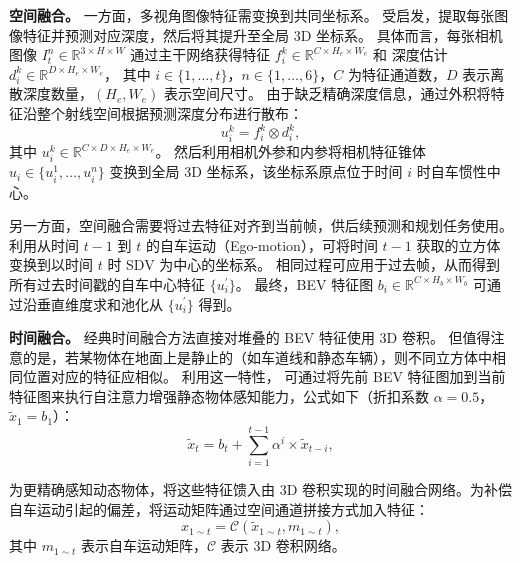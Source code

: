 \documentclass[runningheads]{llncs}
\begin{document}
\noindent\textbf{空间融合。}
%
一方面，多视角图像特征需变换到共同坐标系。
%
受\cite{philion2020lift}启发，提取每张图像特征并预测对应深度，然后将其提升至全局 3D 坐标系。
%
具体而言，每张相机图像 $I_t^n \in \mathbb{R}^{3 \times H \times W}$ 通过主干网络获得特征 $f_i^k \in \mathbb{R}^{C \times H_e \times W_e}$ 和
深度估计 $d_i^k \in \mathbb{R}^{D \times H_e \times W_e}$，
%
其中 $i \in \{1,\dots,t\}$，$n \in \{1,\dots,6\}$，$C$ 为特征通道数，$D$ 表示离散深度数量，$(H_e, W_e)$ 表示空间尺寸。
%
%
由于缺乏精确深度信息，通过外积将特征沿整个射线空间根据预测深度分布进行散布：
\begin{equation}
	u_i^k = f_i^k \otimes d_i^k,
\end{equation}
其中 $u_i^k \in \mathbb{R}^{C \times D \times H_e \times W_e}$。
%
然后利用相机外参和内参将相机特征锥体 $u_i \in \{u_i^1,\dots,u_i^n\}$ 变换到全局 3D 坐标系，该坐标系原点位于时间 $i$ 时自车惯性中心。
%

另一方面，空间融合需要将过去特征对齐到当前帧，供后续预测和规划任务使用。
%
利用从时间 $t-1$ 到 $t$ 的自车运动（Ego-motion），可将时间 $t-1$ 获取的立方体变换到以时间 $t$ 时 SDV 为中心的坐标系。
%
相同过程可应用于过去帧，从而得到所有过去时间戳的自车中心特征 $\{u_i^{'}\}$。
%
最终，BEV 特征图 $b_i \in \mathbb{R}^{C \times H_b \times W_b}$ 可通过沿垂直维度求和池化从 $\{u_i^{'}\}$ 得到。

\noindent\textbf{时间融合。}
%
经典时间融合方法直接对堆叠的 BEV 特征使用 3D 卷积。
%
但值得注意的是，若某物体在地面上是静止的（如车道线和静态车辆），则不同立方体中相同位置对应的特征应相似。
%
利用这一特性，
可通过将先前 BEV 特征图加到当前特征图来执行自注意力增强静态物体感知能力，公式如下（折扣系数 $\alpha = 0.5$，$\tilde{x}_1 = b_1$）：
%
\begin{equation}
\tilde{x}_t = b_t + \sum_{i=1}^{t-1} \alpha^i \times \tilde{x}_{t-i},
\end{equation}

为更精确感知动态物体，将这些特征馈入由 3D 卷积实现的时间融合网络。为补偿自车运动引起的偏差，将运动矩阵通过空间通道拼接方式加入特征：
\begin{equation}
    x_{1\sim t} = \mathcal{C}(\tilde{x}_{1 \sim t}, m_{1 \sim t}),
\end{equation}
其中 $m_{1 \sim t}$ 表示自车运动矩阵，$\mathcal{C}$ 表示 3D 卷积网络。

\end{document}
